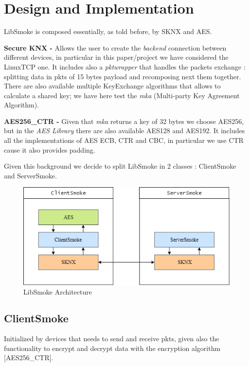 \section{Design and Implementation}
LibSmoke is composed essentially, as told before, by SKNX and AES.\par
\vspace{5mm}
\textbf{Secure KNX - }Allows the user to create the \emph{backend} connection between different devices, in particular in this paper/project we have considered the LinuxTCP one. It includes also a \emph{pktwrapper} that handles the packets exchange : splitting data in pkts of 15 bytes payload and recomposing next them together. There are also available multiple KeyExchange algorithms that allows to calculate a shared key; we have here test the \emph{mka} (Multi-party Key Agreement Algorithm).\par
\vspace{5mm}
\textbf{AES256\_CTR - }Given that \emph{mka} returns a key of 32 bytes we choose AES256, but in the \emph{AES Library} there are also available AES128 and AES192. It includes all the implementations of AES ECB, CTR and CBC, in particular we use CTR cause it also provides padding.\par
\vspace{5mm}
Given this background we decide to split LibSmoke in 2 classes : ClientSmoke and ServerSmoke.

\vspace{0.5cm}
\begin{figure}[h]
	\centering
	\includegraphics[scale=0.7]{Images/Diagrams/Architecture}
	\caption{LibSmoke Architecture}
\end{figure}
\vspace{0.2cm}

\newpage
\subsection{ClientSmoke}
Initialized by devices that needs to send and receive pkts, given also the functionality to encrypt and decrypt data with the encryption algorithm [AES256\_CTR].

